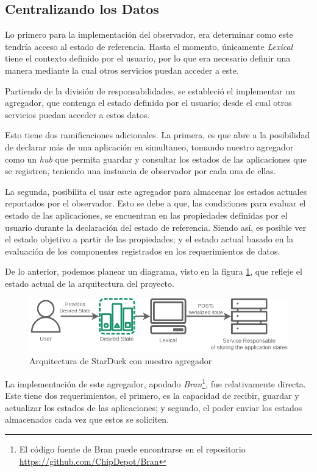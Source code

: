 \subsection{Centralizando los Datos}

Lo primero para la implementación del observador, era determinar como este tendría acceso al estado de referencia. Hasta el momento, únicamente \textit{Lexical} tiene el contexto definido por el usuario, por lo que era necesario definir una manera mediante la cual otros servicios puedan acceder a este.

Partiendo de la división de responsabilidades, se estableció el implementar un agregador, que contenga el estado definido por el usuario; desde el cual otros servicios puedan acceder a estos datos. 

Esto tiene dos ramificaciones adicionales. La primera, es que abre a la posibilidad de declarar más de una aplicación en simultaneo, tomando nuestro agregador como un \textit{hub} que permita guardar y consultar los estados de las aplicaciones que se registren, teniendo una instancia de observador por cada una de ellas.

La segunda, posibilita el usar este agregador para almacenar los estados actuales reportados por el observador. Esto se debe a que, las condiciones para evaluar el estado de las aplicaciones, se encuentran en las propiedades definidas por el usuario durante la declaración del estado de referencia. Siendo así, es posible ver el estado objetivo a partir de las propiedades; y el estado actual basado en la evaluación de los componentes registrados en los requerimientos de datos.

De lo anterior, podemos planear un diagrama, visto en la figura \ref{fig:StarDuckMini}, que refleje el estado actual de la arquitectura del proyecto.

\begin{figure}[ht]
    \centering
    \caption{Arquitectura de StarDuck con nuestro agregador}
    \label{fig:StarDuckMini}
    \includegraphics[width=0.9\linewidth]{images/StarDuckMini.pdf}
\end{figure}

La implementación de este agregador, apodado \textit{Bran}\footnote{El código fuente de Bran puede encontrarse en el repositorio \url{https://github.com/ChipDepot/Bran}}, fue relativamente directa. Este tiene dos requerimientos, el primero, es la capacidad de recibir, guardar y actualizar los estados de las aplicaciones; y segundo, el poder enviar los estados almacenados cada vez que estos se soliciten.

